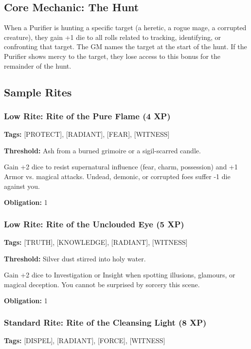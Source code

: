 \subsection{Core Mechanic: The Hunt}

When a Purifier is hunting a specific target (a heretic, a rogue mage, a corrupted creature), they gain +1 die to all rolls related to tracking, identifying, or confronting that target. The GM names the target at the start of the hunt. If the Purifier shows mercy to the target, they lose access to this bonus for the remainder of the hunt.

\subsection{Sample Rites}

\subsubsection{Low Rite: Rite of the Pure Flame (4 XP)}

\textbf{Tags:} [PROTECT], [RADIANT], [FEAR], [WITNESS]

\textbf{Threshold:} Ash from a burned grimoire or a sigil-scarred candle.

Gain +2 dice to resist supernatural influence (fear, charm, possession) and +1 Armor vs. magical attacks. Undead, demonic, or corrupted foes suffer -1 die against you.

\textbf{Obligation:} 1

\subsubsection{Low Rite: Rite of the Unclouded Eye (5 XP)}

\textbf{Tags:} [TRUTH], [KNOWLEDGE], [RADIANT], [WITNESS]

\textbf{Threshold:} Silver dust stirred into holy water.

Gain +2 dice to Investigation or Insight when spotting illusions, glamours, or magical deception. You cannot be surprised by sorcery this scene.

\textbf{Obligation:} 1

\subsubsection{Standard Rite: Rite of the Cleansing Light (8 XP)}

\textbf{Tags:} [DISPEL], [RADIANT], [FORCE], [WITNESS]

